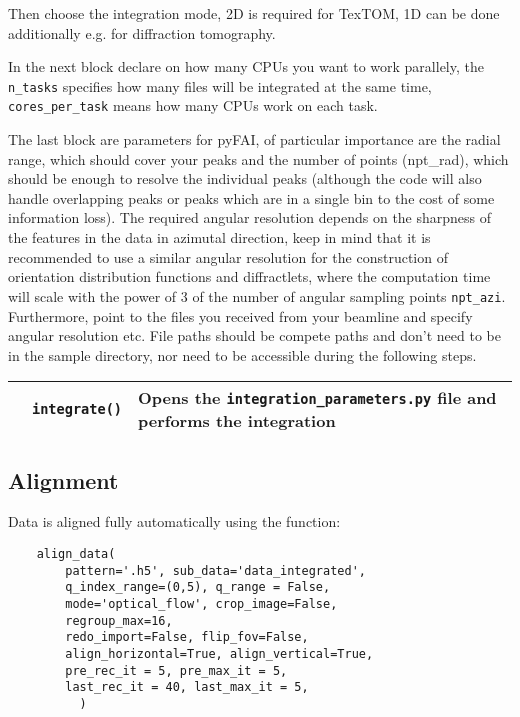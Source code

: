 Then choose the integration mode, 2D is required for TexTOM, 1D can be done additionally e.g. for diffraction tomography.

In the next block declare on how many CPUs you want to work parallely, the \texttt{n\_tasks} specifies how many files will be integrated
at the same time, \texttt{cores\_per\_task} means how many CPUs work on each task.

The last block are parameters for pyFAI, of particular importance are the radial range, which should cover your peaks
and the number of points (npt\_rad), which should be enough to resolve the individual peaks (although the code will
also handle overlapping peaks or peaks which are in a single bin to the cost of some information loss).
The required angular resolution depends on the sharpness of the features in the data in azimutal direction,
keep in mind that it is recommended to use a similar angular resolution for the construction of orientation
distribution functions and diffractlets, where the computation time will scale with the power of 3 of the number
of angular sampling points \texttt{npt\_azi}.  
Furthermore, point to the files you received from your beamline and specify angular resolution etc.
File paths should be compete paths and don't need to be in the sample directory, nor need to be accessible
during the following steps.

\begin{table}[h!]
    \centering
    \begin{tabular}{| l | l | l |} 
        \hline
         & \texttt{integrate()} & Opens the \texttt{integration\_parameters.py} file and performs the integration\\
      \hline
     \end{tabular}
\end{table}

\subsection{Alignment}

Data is aligned fully automatically using the function:
\begin{verbatim}
    align_data( 
        pattern='.h5', sub_data='data_integrated', 
        q_index_range=(0,5), q_range = False,
        mode='optical_flow', crop_image=False, 
        regroup_max=16,
        redo_import=False, flip_fov=False, 
        align_horizontal=True, align_vertical=True,
        pre_rec_it = 5, pre_max_it = 5,
        last_rec_it = 40, last_max_it = 5,
          )
\end{verbatim}


